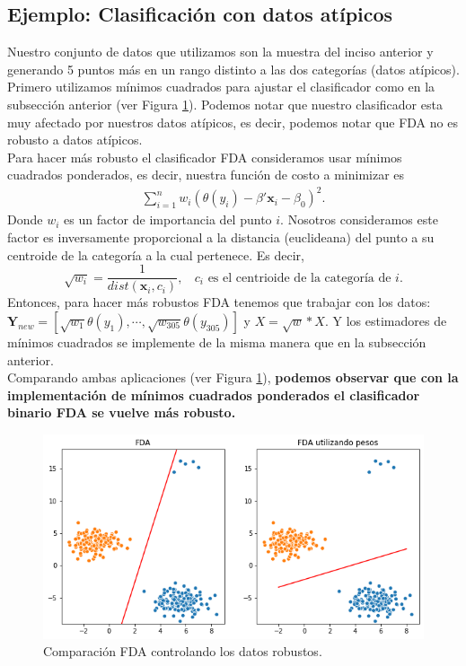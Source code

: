\documentclass[paper=letter, fontsize=11pt]{scrartcl}
\newcommand{\xb}{\mathbf{x}}
\newcommand{\Yb}{\mathbf{Y}}
\newcommand{\sumi}{\sum_{i=1}^n}
\numberwithin{equation}{section} %
\numberwithin{figure}{section} %
\numberwithin{table}{section} %
\begin{document}
\subsection{Ejemplo: Clasificación con datos atípicos}
Nuestro conjunto de datos que utilizamos son la muestra del inciso anterior y generando 5 puntos más en un rango distinto a las dos categorías (datos atípicos). Primero utilizamos mínimos cuadrados para ajustar el clasificador como en la subsección anterior (ver Figura \ref{fig:fda_pesos}). Podemos notar que nuestro clasificador esta muy afectado por nuestros datos atípicos, es decir, podemos notar que FDA no es robusto a datos atípicos.\\  

Para hacer más robusto el clasificador FDA consideramos usar mínimos cuadrados ponderados, es decir, nuestra función de costo a minimizar es
\begin{align*}
\sumi w_i\left(\theta(y_i)-\beta'\xb_i-\beta_0 \right)^2. 
\end{align*}
Donde $w_i$ es un factor de importancia del punto $i$. Nosotros consideramos este factor es inversamente proporcional a la distancia (euclideana) del punto a su centroide de la categoría a la cual pertenece. Es decir,
$$\sqrt{w_i}=\frac{1}{dist(\xb_i, c_{i})}, \ \ \ \ c_{i}\text{ es el centrioide de la categoría de } i.$$
Entonces, para hacer más robustos FDA tenemos que trabajar con los datos: $\Yb_{new}=[\sqrt{w_1}\theta(y_1),\cdots,\sqrt{w_{305}}\theta(y_{305})]$ y $X=\sqrt{w}*X.$ Y los estimadores de mínimos cuadrados se implemente de la misma manera que en la subsección anterior.
\\

Comparando ambas aplicaciones (ver Figura \ref{fig:fda_pesos}), \textbf{podemos observar que con la implementación de mínimos cuadrados ponderados el clasificador binario FDA se vuelve más robusto.}
\begin{figure}[H]
    \centering
    \includegraphics[scale=0.5]{figure/fda_pesos.png}
    \caption{Comparación FDA controlando los datos robustos.}
    \label{fig:fda_pesos}
\end{figure}
\end{document}
